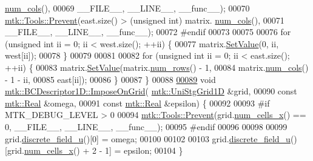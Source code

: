 \begin{DoxyCode}
      \hyperlink{classmtk_1_1DenseMatrix_a41747502d468c6728a4be31501b16e0e}{num\_cols}(),
00069                       \_\_FILE\_\_, \_\_LINE\_\_, \_\_func\_\_);
00070   \hyperlink{classmtk_1_1Tools_a332324c6f25e66be9dff48c5987a3b9f}{mtk::Tools::Prevent}(east.size() > (\textcolor{keywordtype}{unsigned} int) matrix.
      \hyperlink{classmtk_1_1DenseMatrix_a41747502d468c6728a4be31501b16e0e}{num\_cols}(),
00071                       \_\_FILE\_\_, \_\_LINE\_\_, \_\_func\_\_);
00072 \textcolor{preprocessor}{  #endif}
00073 
00075 
00076   \textcolor{keywordflow}{for} (\textcolor{keywordtype}{unsigned} \textcolor{keywordtype}{int} ii = 0; ii < west.size(); ++ii) \{
00077     matrix.\hyperlink{classmtk_1_1DenseMatrix_a784ce5784109ac86bfb9d8562b334b13}{SetValue}(0, ii, west[ii]);
00078   \}
00079 
00081 
00082   \textcolor{keywordflow}{for} (\textcolor{keywordtype}{unsigned} \textcolor{keywordtype}{int} ii = 0; ii < east.size(); ++ii) \{
00083     matrix.\hyperlink{classmtk_1_1DenseMatrix_a784ce5784109ac86bfb9d8562b334b13}{SetValue}(matrix.\hyperlink{classmtk_1_1DenseMatrix_a53f3afb3b6a8d21854458aaa9663cc74}{num\_rows}() - 1,
00084                     matrix.\hyperlink{classmtk_1_1DenseMatrix_a41747502d468c6728a4be31501b16e0e}{num\_cols}() - 1 - ii,
00085                     east[ii]);
00086   \}
00087 \}
00088 
\hypertarget{mtk__bc__descriptor__1d_8cc_source_l00089}{}\hyperlink{classmtk_1_1BCDescriptor1D_adfb101c1a12b452f83dacd207febea0a}{00089} \textcolor{keywordtype}{void} \hyperlink{classmtk_1_1BCDescriptor1D_adfb101c1a12b452f83dacd207febea0a}{mtk::BCDescriptor1D::ImposeOnGrid}(
      \hyperlink{classmtk_1_1UniStgGrid1D}{mtk::UniStgGrid1D} &grid,
00090                                        \textcolor{keyword}{const} \hyperlink{group__c01-roots_gac080bbbf5cbb5502c9f00405f894857d}{mtk::Real} &omega,
00091                                        \textcolor{keyword}{const} \hyperlink{group__c01-roots_gac080bbbf5cbb5502c9f00405f894857d}{mtk::Real} &epsilon) \{
00092 
00093 \textcolor{preprocessor}{  #if MTK\_DEBUG\_LEVEL > 0}
00094   \hyperlink{classmtk_1_1Tools_a332324c6f25e66be9dff48c5987a3b9f}{mtk::Tools::Prevent}(grid.\hyperlink{classmtk_1_1UniStgGrid1D_af1b3729d8afa07be5b2775ed68015b80}{num\_cells\_x}() == 0, \_\_FILE\_\_, \_\_LINE\_\_, \_\_func\_\_);
00095 \textcolor{preprocessor}{  #endif}
00096 
00098 
00099   grid.\hyperlink{classmtk_1_1UniStgGrid1D_acf28d702f6e702599986afcb253bbfc1}{discrete\_field\_u}()[0] = omega;
00100 
00102 
00103   grid.\hyperlink{classmtk_1_1UniStgGrid1D_acf28d702f6e702599986afcb253bbfc1}{discrete\_field\_u}()[grid.\hyperlink{classmtk_1_1UniStgGrid1D_af1b3729d8afa07be5b2775ed68015b80}{num\_cells\_x}() + 2 - 1] = epsilon;
00104 \}
\end{DoxyCode}
